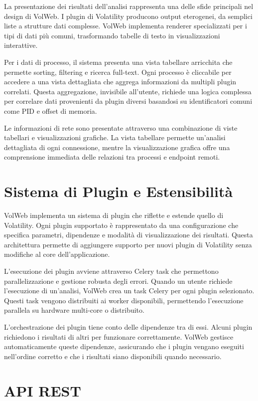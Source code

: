 La presentazione dei risultati dell'analisi rappresenta una delle sfide principali nel design di VolWeb. I plugin di Volatility producono output eterogenei, da semplici liste a strutture dati complesse. VolWeb implementa renderer specializzati per i tipi di dati più comuni, trasformando tabelle di testo in visualizzazioni interattive.

Per i dati di processo, il sistema presenta una vista tabellare arricchita che permette sorting, filtering e ricerca full-text. Ogni processo è cliccabile per accedere a una vista dettagliata che aggrega informazioni da multipli plugin correlati. Questa aggregazione, invisibile all'utente, richiede una logica complessa per correlare dati provenienti da plugin diversi basandosi su identificatori comuni come PID e offset di memoria.

Le informazioni di rete sono presentate attraverso una combinazione di viste tabellari e visualizzazioni grafiche. La vista tabellare permette un'analisi dettagliata di ogni connessione, mentre la visualizzazione grafica offre una comprensione immediata delle relazioni tra processi e endpoint remoti.

\section{Sistema di Plugin e Estensibilità}

VolWeb implementa un sistema di plugin che riflette e estende quello di Volatility. Ogni plugin supportato è rappresentato da una configurazione che specifica parametri, dipendenze e modalità di visualizzazione dei risultati. Questa architettura permette di aggiungere supporto per nuovi plugin di Volatility senza modifiche al core dell'applicazione.

L'esecuzione dei plugin avviene attraverso Celery task che permettono parallelizzazione e gestione robusta degli errori. Quando un utente richiede l'esecuzione di un'analisi, VolWeb crea un task Celery per ogni plugin selezionato. Questi task vengono distribuiti ai worker disponibili, permettendo l'esecuzione parallela su hardware multi-core o distribuito.

L'orchestrazione dei plugin tiene conto delle dipendenze tra di essi. Alcuni plugin richiedono i risultati di altri per funzionare correttamente. VolWeb gestisce automaticamente queste dipendenze, assicurando che i plugin vengano eseguiti nell'ordine corretto e che i risultati siano disponibili quando necessario.

\section{API REST}

